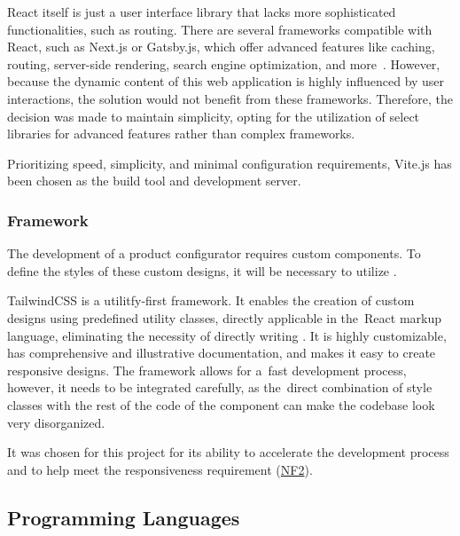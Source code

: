 React itself is just a user interface library that lacks more sophisticated functionalities, such as routing. There are several frameworks compatible with React, such as Next.js or Gatsby.js, which offer advanced features like caching, routing, server-side rendering, search engine optimization, and more~\cite{Eze2023}. However, because the dynamic content of this web application is highly influenced by user interactions, the solution would not benefit from these frameworks. Therefore, the decision was made to maintain simplicity, opting for the utilization of select libraries for advanced features rather than complex frameworks.

Prioritizing speed, simplicity, and minimal configuration requirements, Vite.js has been chosen as the build tool and development server.~\cite{Said2023}


\subsubsection{ Framework}

The development of a product configurator requires custom components. To define the styles of these custom designs, it will be necessary to utilize .

TailwindCSS is a utilitfy-first  framework. It enables the creation of custom designs using predefined  utility classes, directly applicable in the~React markup language, eliminating the necessity of directly writing . It is highly customizable, has comprehensive and illustrative documentation, and makes it easy to create responsive designs. The framework allows for a~fast development process, however, it needs to be integrated carefully, as the~direct combination of style classes with the rest of the code of the component can make the codebase look very disorganized.~\cite{TailwindCSS}

It was chosen for this project for its ability to accelerate the development process and to help meet the responsiveness requirement (\hyperref[itm:NF2]{NF2}).


\subsection{Programming Languages}

